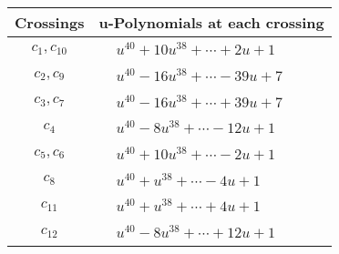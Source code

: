 \documentclass[1p]{elsarticle_modified}
\theoremstyle{definition}
\begin{document}
\begin{tabular}{m{50pt}|m{274pt}}
Crossings & \hspace{64pt}u-Polynomials at each crossing \\
\hline $$\begin{aligned}c_{1},c_{10}\end{aligned}$$&$\begin{aligned}
&u^{40}+10 u^{38}+\cdots+2 u+1
\end{aligned}$\\
\hline $$\begin{aligned}c_{2},c_{9}\end{aligned}$$&$\begin{aligned}
&u^{40}-16 u^{38}+\cdots-39 u+7
\end{aligned}$\\
\hline $$\begin{aligned}c_{3},c_{7}\end{aligned}$$&$\begin{aligned}
&u^{40}-16 u^{38}+\cdots+39 u+7
\end{aligned}$\\
\hline $$\begin{aligned}c_{4}\end{aligned}$$&$\begin{aligned}
&u^{40}-8 u^{38}+\cdots-12 u+1
\end{aligned}$\\
\hline $$\begin{aligned}c_{5},c_{6}\end{aligned}$$&$\begin{aligned}
&u^{40}+10 u^{38}+\cdots-2 u+1
\end{aligned}$\\
\hline $$\begin{aligned}c_{8}\end{aligned}$$&$\begin{aligned}
&u^{40}+u^{38}+\cdots-4 u+1
\end{aligned}$\\
\hline $$\begin{aligned}c_{11}\end{aligned}$$&$\begin{aligned}
&u^{40}+u^{38}+\cdots+4 u+1
\end{aligned}$\\
\hline $$\begin{aligned}c_{12}\end{aligned}$$&$\begin{aligned}
&u^{40}-8 u^{38}+\cdots+12 u+1
\end{aligned}$\\
\hline
\end{tabular}\\~\\
\end{document}

